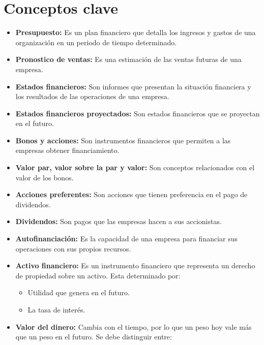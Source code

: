 \documentclass{templateNote}
\begin{document}


\portada
\margenes 
\tableofcontents
\newpage

\section{Conceptos clave}

\begin{itemize}
    \item \textbf{Presupuesto:} Es un plan financiero que detalla los ingresos y gastos de una organización en un periodo de tiempo determinado.
    \item \textbf{Pronostico de ventas:} Es una estimación de las ventas futuras de una empresa.
    \item \textbf{Estados financieros:} Son informes que presentan la situación financiera y los resultados de las operaciones de una empresa.
    \item \textbf{Estados financieros proyectados:} Son estados financieros que se proyectan en el futuro.
    \item \textbf{Bonos y acciones:} Son instrumentos financieros que permiten a las empresas obtener financiamiento.
    \item \textbf{Valor par, valor sobre la par y valor:} Son conceptos relacionados con el valor de los bonos.
    \item \textbf{Acciones preferentes:} Son acciones que tienen preferencia en el pago de dividendos.
    \item \textbf{Dividendos:} Son pagos que las empresas hacen a sus accionistas.
    \item \textbf{Autofinanciación:} Es la capacidad de una empresa para financiar sus operaciones con sus propios recursos.
    \item \textbf{Activo financiero:} Es un instrumento financiero que representa un derecho de propiedad sobre un activo. Esta determinado por:
    \begin{itemize}
        \item Utilidad que genera en el futuro.
        \item La tasa de interés.
    \end{itemize}
    \item \textbf{Valor del dinero:} Cambia con el tiempo, por lo que un peso hoy vale más que un peso en el futuro. Se debe distinguir entre:

\end{itemize}
\end{document}
